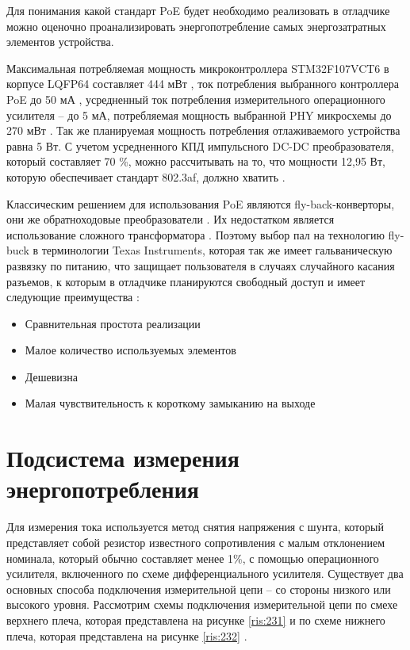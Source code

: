 Для понимания какой стандарт PoE будет необходимо реализовать в отладчике
можно оценочно проанализировать энергопотребление самых энергозатратных элементов устройства.

Максимальная потребляемая мощность микроконтроллера STM32F107VCT6 в корпусе LQFP64 составляет 
444 мВт \cite{STM32:datasheet}, ток потребления выбранного контроллера PoE до 50 мА 
\cite{TPS2376:datasheet}, усредненный ток потребления измерительного операционного усилителя --
до 5 мА, потребляемая мощность выбранной PHY микросхемы до 270 мВт \cite{DP83848:datasheet}. Так же
планируемая мощность потребления отлаживаемого устройства равна 5 Вт.
С учетом усредненного КПД импульсного DC-DC преобразователя, который составляет 70 \%, можно
рассчитывать на то, что мощности 12,95 Вт, которую обеспечивает стандарт 802.3af, должно хватить 
\cite{IEEE 802.3af}.

Классическим решением для использования PoE являются fly-back-конверторы, они же обратноходовые
преобразователи \cite{TPS2376:datasheet}. Их недостатком является использование сложного
 трансформатора \cite{PowerElectronic:FlyBack}. Поэтому выбор пал на технологию
fly-buck в терминологии Texas Instruments, которая так же имеет гальваническую развязку по питанию,
что защищает пользователя в случаях случайного касания разъемов, к которым в отладчике 
планируются свободный доступ и имеет следующие преимущества \cite{PowerElectronic:FlyBack}:

\begin{itemize}
  \item Сравнительная простота реализации
  \item Малое количество используемых элементов
  \item Дешевизна
  \item Малая чувствительность к короткому замыканию на выходе
\end{itemize}


\section{Подсистема измерения энергопотребления}
\hspace{1cm} 

Для измерения тока используется метод снятия напряжения с шунта,
 который представляет собой резистор известного сопротивления с малым отклонением номинала,
 который обычно составляет менее 1\%, с помощью операционного
усилителя, включенного по схеме дифференциального усилителя.
Существует два основных способа подключения измерительной цепи – со стороны низкого
или высокого уровня. Рассмотрим схемы подключения измерительной цепи по смехе верхнего плеча, 
которая представлена на рисунке
\ref{ris:231} и по схеме нижнего плеча, которая представлена на рисунке \ref{ris:232} 
\cite{CurrentMeasSolution}.


